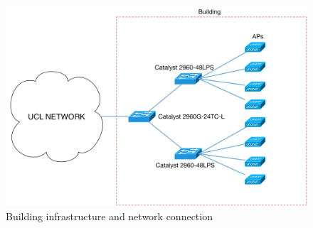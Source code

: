 \begin{figure}[H]
	\includegraphics[width=1\linewidth]{Pictures/chapter2/building.png}
	\caption{Building infrastructure and network connection}
\end{figure}







